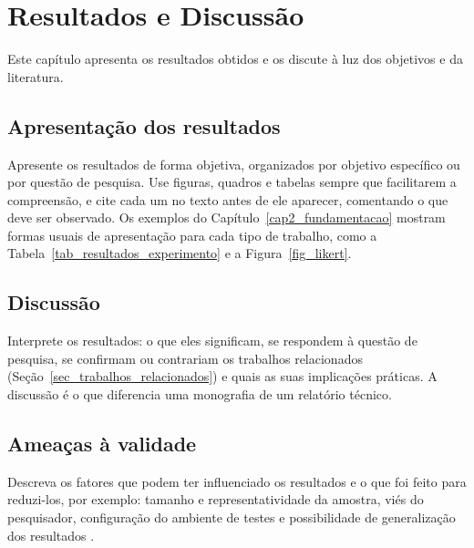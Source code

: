 \chapter{Resultados e Discussão}
\label{cap4_resultados}


Este capítulo apresenta os resultados obtidos e os discute à luz dos objetivos e da literatura.

\section{Apresentação dos resultados}
\label{sec_res_apresentacao}

Apresente os resultados de forma objetiva, organizados por objetivo específico ou por questão de pesquisa. Use figuras, quadros e tabelas sempre que facilitarem a compreensão, e cite cada um no texto antes de ele aparecer, comentando o que deve ser observado. Os exemplos do Capítulo~\ref{cap2_fundamentacao} mostram formas usuais de apresentação para cada tipo de trabalho, como a Tabela~\ref{tab_resultados_experimento} e a Figura~\ref{fig_likert}.

\section{Discussão}
\label{sec_res_discussao}

Interprete os resultados: o que eles significam, se respondem à questão de pesquisa, se confirmam ou contrariam os trabalhos relacionados (Seção~\ref{sec_trabalhos_relacionados}) e quais as suas implicações práticas. A discussão é o que diferencia uma monografia de um relatório técnico.

\section{Ameaças à validade}
\label{sec_res_ameacas}

Descreva os fatores que podem ter influenciado os resultados e o que foi feito para reduzi-los, por exemplo: tamanho e representatividade da amostra, viés do pesquisador, configuração do ambiente de testes e possibilidade de generalização dos resultados \cite{wohlin2012experimentation}.
